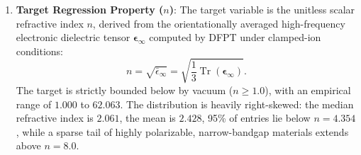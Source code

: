 \documentclass[journal,article,submit,moreauthors,pdftex]{article}
\begin{document}
\begin{enumerate}
    \item \textbf{Target Regression Property ($n$)}: The target variable is the unitless scalar refractive index $n$, derived from the orientationally averaged high-frequency electronic dielectric tensor $\boldsymbol{\epsilon}_{\infty}$ computed by DFPT under clamped-ion conditions:
    \begin{equation}
        n = \sqrt{\bar{\epsilon}_{\infty}} = \sqrt{\frac{1}{3}\operatorname{Tr}(\boldsymbol{\epsilon}_{\infty})}.
    \end{equation}
    The target is strictly bounded below by vacuum ($n \ge 1.0$), with an empirical range of $1.000$ to $62.063$. The distribution is heavily right-skewed: the median refractive index is $2.061$, the mean is $2.428$, 95\% of entries lie below $n = 4.354$, while a sparse tail of highly polarizable, narrow-bandgap materials extends above $n = 8.0$.
\end{enumerate}
\end{document}
